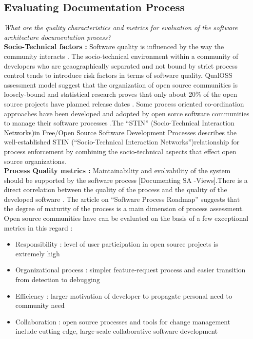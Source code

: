 \subsection{Evaluating Documentation Process}
\indent \emph{What are the quality characteristics and metrics for evaluation of the software architecture documentation process?}
\newline
\\\indent \textbf{Socio-Technical factors : } Software quality is influenced by the way the community interacts \cite{Mens2011}. The socio-technical environment within a community of developers who are geaographically separated and not bound by strict process control tends to introduce risk factors in terms of software quality. QualOSS assessment model \cite{5314237} suggest that the organization of open source communities is loosely-bound and statistical research \cite{Zhao2003} proves that only about 20\% of the open source projects have planned release dates . Some process oriented co-ordination approaches have been developed and adopted by open sorce software communities to manage their software processes .The \enquote{STIN} (Socio-Technical Interaction Networks)in Free/Open Source Software Development Processes \cite{SPM_2005} describes the well-established STIN (\enquote{Socio-Technical Interaction Networks})relationship for process enforcement by combining the socio-technical aspects that effect open source organizations. 
\\\indent \textbf{Process Quality metrics : } Maintainability and evolvability of the system should be supported by the software process [Documenting SA -Views].There is a direct correlation between the quality of the process and the quality of the developed software \cite{Fuggeffa1988}. The article on \enquote{Software Process Roadmap} \cite{Fuggeffa1988} suggests that the degree of maturity of the process is a main dimension of process assessment. Open source communities have can be evaluated on the basis of a few exceptional metrics in this regard \cite{Zhao2003} :
\begin{itemize}
\item Responsibility : level of user participation in open source projects is extremely high
\item Organizational process : simpler feature-request process and easier transition from detection to debugging 
\item Efficiency : larger motivation of developer to propagate personal need to community need
\item Collaboration : open source processes and tools for change management include cutting edge, large-scale collaborative software development
\end{itemize}
